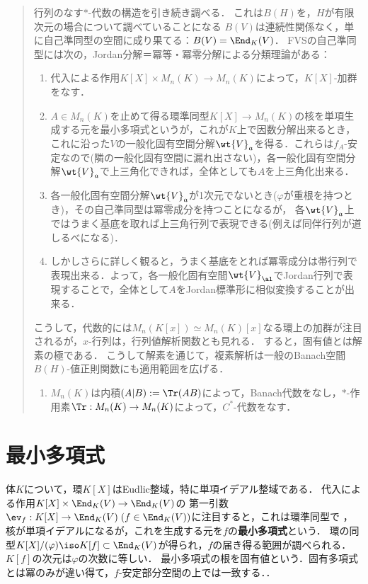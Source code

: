 \documentclass[uplatex, dvipdfmx]{jsreport}
\begin{document}
\begin{quotation}
    行列のなす$*$-代数の構造を引き続き調べる．
    これは$B(H)$を，$H$が有限次元の場合について調べていることになる
    $B(V)$は連続性関係なく，単に自己準同型の空間に成り果てる：$B(V)=\End_K(V)$．
    FVSの自己準同型には次の，Jordan分解＝冪等・冪零分解による分類理論がある：
    \begin{enumerate}
        \item 代入による作用$K[X]\times M_n(K)\to M_n(K)$によって，$K[X]$-加群をなす．
        \item $A\in M_n(K)$を止めて得る環準同型$K[X]\to M_n(K)$の核を単項生成する元を最小多項式というが，これが$K$上で因数分解出来るとき，これに沿った$V$の一般化固有空間分解$\wt{V}_a$を得る．これらは$f_A$-安定なので(隣の一般化固有空間に漏れ出さない)，各一般化固有空間分解$\wt{V}_a$で上三角化できれば，全体としても$A$を上三角化出来る．
        \item 各一般化固有空間分解$\wt{V}_a$が1次元でないとき($\varphi$が重根を持つとき)，その自己準同型は冪零成分を持つことになるが，
        各$\wt{V}_a$上ではうまく基底を取れば上三角行列で表現できる(例えば同伴行列が道しるべになる)．
        \item しかしさらに詳しく観ると，うまく基底をとれば冪零成分は帯行列で表現出来る．よって，各一般化固有空間$\wt{V}_\al$でJordan行列で表現することで，全体として$A$をJordan標準形に相似変換することが出来る．
    \end{enumerate}
    こうして，代数的には$M_n(K[x])\simeq M_n(K)[x]$なる環上の加群が注目されるが，$x$-行列は，行列値解析関数とも見れる．
    すると，固有値とは解素の極である．
    こうして解素を通じて，複素解析は一般のBanach空間$B(H)$-値正則関数にも適用範囲を広げる．
    \begin{enumerate}
        \item $M_n(K)$は内積$(A|B):=\Tr(AB)$によって，Banach代数をなし，$*$-作用素$\Tr:M_n(K)\to M_n(K)$によって，$C^*$-代数をなす．
    \end{enumerate}
\end{quotation}

\section{最小多項式}

\begin{tcolorbox}[colframe=ForestGreen, colback=ForestGreen!10!white,breakable,colbacktitle=ForestGreen!40!white,coltitle=black,fonttitle=\bfseries\sffamily,
title=]
    体$K$について，環$K[X]$はEudlic整域，特に単項イデアル整域である．
    代入による作用$K[X]\times\End_K(V)\to\End_K(V)$の
    第一引数$\ev_f:K[X]\to\End_K(V)\;(f\in\End_K(V))$に注目すると，これは環準同型で
    ，核が単項イデアルになるが，これを生成する元を$f$の\textbf{最小多項式}という．
    環の同型$K[X]/(\varphi)\iso K[f]\subset \End_K(V)$が得られ，$f$の届き得る範囲が調べられる．
    $K[f]$の次元は$\varphi$の次数に等しい．
    最小多項式の根を固有値という．固有多項式とは冪のみが違い得て，$f$-安定部分空間の上では一致する．．
\end{tcolorbox}
\end{document}
